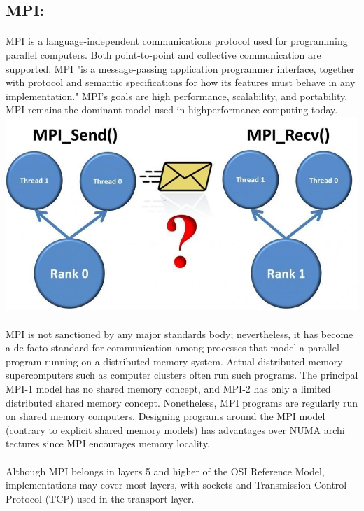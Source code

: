 \documentclass[10pt,a4paper]{article}
\begin{document}
\subsection{MPI: }
\paragraph{} MPI is a language-independent communications protocol used for programming parallel computers. Both point-to-point and collective communication are supported. MPI "is a message-passing application programmer interface, together with protocol and semantic specifications for how its features must behave in any implementation." MPI's goals are high performance, scalability, and portability. MPI remains the dominant model used in highperformance computing today. \\
\includegraphics[width = \textwidth]{clustertime_diag2}
\paragraph{} MPI is not sanctioned by any major standards body; nevertheless, it has become a de facto standard for communication among processes that model a parallel program running on a distributed memory system. Actual distributed memory supercomputers such as computer clusters often run such programs. The principal MPI-1 model has no shared memory concept, and MPI-2 has only a limited distributed shared memory concept. Nonetheless, MPI programs are regularly run on shared memory computers. Designing programs around the MPI model (contrary to explicit shared memory models) has advantages over NUMA archi tectures since MPI encourages memory locality. 
\paragraph{} Although MPI belongs in layers 5 and higher of the OSI Reference Model, implementations may cover most layers, with sockets and Transmission Control Protocol (TCP) used in the transport layer. 
\end{document}
